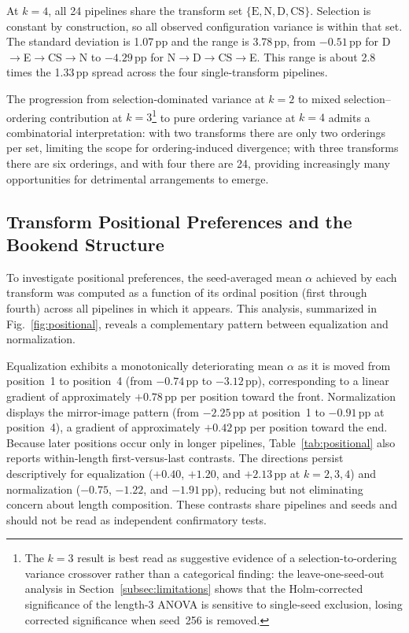 \documentclass[preprint,review,12pt]{elsarticle}
\begin{document}
At $k=4$, all 24 pipelines share the transform set $\{\text{E},\text{N},\text{D},\text{CS}\}$. Selection is constant by construction, so all observed configuration variance is within that set. The standard deviation is 1.07\,pp and the range is 3.78\,pp, from $-0.51$\,pp for D$\to$E$\to$CS$\to$N to $-4.29$\,pp for N$\to$D$\to$CS$\to$E. This range is about 2.8 times the 1.33\,pp spread across the four single-transform pipelines.

The progression from selection-dominated variance at $k=2$ to mixed selection--ordering contribution at $k=3$\footnote{The $k=3$ result is best read as suggestive evidence of a selection-to-ordering variance crossover rather than a categorical finding: the leave-one-seed-out analysis in Section~\ref{subsec:limitations} shows that the Holm-corrected significance of the length-3 ANOVA is sensitive to single-seed exclusion, losing corrected significance when seed~256 is removed.} to pure ordering variance at $k=4$ admits a combinatorial interpretation: with two transforms there are only two orderings per set, limiting the scope for ordering-induced divergence; with three transforms there are six orderings, and with four there are 24, providing increasingly many opportunities for detrimental arrangements to emerge.

\subsection{Transform Positional Preferences and the Bookend Structure}
\label{subsec:positional}

To investigate positional preferences, the seed-averaged mean $\alpha$ achieved by each transform was computed as a function of its ordinal position (first through fourth) across all pipelines in which it appears. This analysis, summarized in Fig.~\ref{fig:positional}, reveals a complementary pattern between equalization and normalization.

Equalization exhibits a monotonically deteriorating mean $\alpha$ as it is moved from position~1 to position~4 (from $-0.74$\,pp to $-3.12$\,pp), corresponding to a linear gradient of approximately $+0.78$\,pp per position toward the front. Normalization displays the mirror-image pattern (from $-2.25$\,pp at position~1 to $-0.91$\,pp at position~4), a gradient of approximately $+0.42$\,pp per position toward the end. Because later positions occur only in longer pipelines, Table~\ref{tab:positional} also reports within-length first-versus-last contrasts. The directions persist descriptively for equalization ($+0.40$, $+1.20$, and $+2.13$\,pp at $k=2,3,4$) and normalization ($-0.75$, $-1.22$, and $-1.91$\,pp), reducing but not eliminating concern about length composition. These contrasts share pipelines and seeds and should not be read as independent confirmatory tests.
\end{document}
